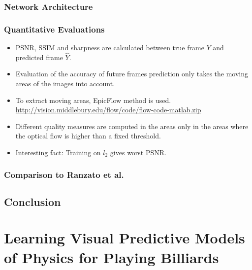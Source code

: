 \documentclass{article}
\begin{document}
    \subsubsection{Network Architecture}\label{subsubsec:Deep_Multi_Scale_Video_Prediction_Beyond_Mean_Square_Error:network-architecture}

    \subsubsection{Quantitative Evaluations}\label{subsubsec:Deep_Multi_Scale_Video_Prediction_Beyond_Mean_Square_Error:quantitative-evaluations}
    \begin{itemize}
        \item PSNR, SSIM and sharpness are calculated between true frame $Y$ and predicted frame $\hat{Y}$.
        \item Evaluation of the accuracy of future frames prediction only takes the moving areas of the images into account.
        \item To extract moving areas, EpicFlow method is used. \\
        \url{http://vision.middlebury.edu/flow/code/flow-code-matlab.zip}
        \item Different quality measures are computed in the areas only in the areas where the optical flow is higher than a fixed threshold.
        \item Interesting fact: Training on $l_2$ gives worst PSNR\@.
    \end{itemize}

    \subsubsection{Comparison to Ranzato et al.}\label{subsubsec:Deep_Multi_Scale_Video_Prediction_Beyond_Mean_Square_Error:comparison-to-ranzato-et-al.}

    \subsection{Conclusion}\label{subsec:Deep_Multi_Scale_Video_Prediction_Beyond_Mean_Square_Error:conclusion}
    \newpage


    \section{Learning Visual Predictive Models of Physics for Playing Billiards}\label{sec:Learning_Visual_Predictive_Models_of_Physics_for_Playing_Billiards}
\end{document}
